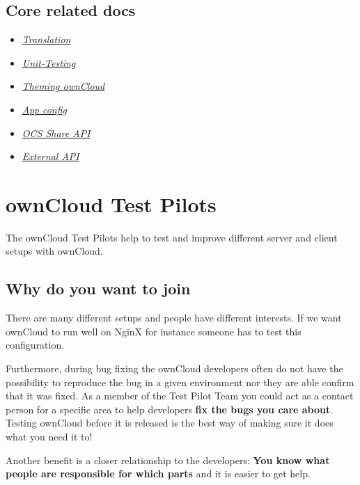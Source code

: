\documentclass[letterpaper,10pt,english]{sphinxmanual}
\begin{document}
\subsection{Core related docs}
\label{core/index:core-related-docs}\begin{itemize}
\item {} 
{\hyperref[core/translation::doc]{\emph{Translation}}}

\item {} 
{\hyperref[core/unit-testing::doc]{\emph{Unit-Testing}}}

\item {} 
{\hyperref[core/theming::doc]{\emph{Theming ownCloud}}}

\item {} 
{\hyperref[core/configfile::doc]{\emph{App config}}}

\item {} 
{\hyperref[core/ocs-share-api::doc]{\emph{OCS Share API}}}

\item {} 
{\hyperref[core/externalapi::doc]{\emph{External API}}}

\end{itemize}


\section{ownCloud Test Pilots}
\label{testing/index:owncloud-test-pilots}\label{testing/index::doc}
The ownCloud Test Pilots help to test and improve different server and client setups with ownCloud.


\subsection{Why do you want to join}
\label{testing/index:why-do-you-want-to-join}
There are many different setups and people have different interests. If we want ownCloud to run well on NginX for instance someone has to test this configuration.

Furthermore, during bug fixing the ownCloud developers often do not have the possibility to reproduce the bug in a given environment nor they are able confirm that it was fixed. As a member of the Test Pilot Team you could act as a contact person for a specific area to help developers \textbf{fix the bugs you care about}. Testing ownCloud before it is released is the best way of making sure it does what you need it to!

Another benefit is a closer relationship to the developers: \textbf{You know what people are responsible for which parts} and it is easier to get help.
\end{document}
